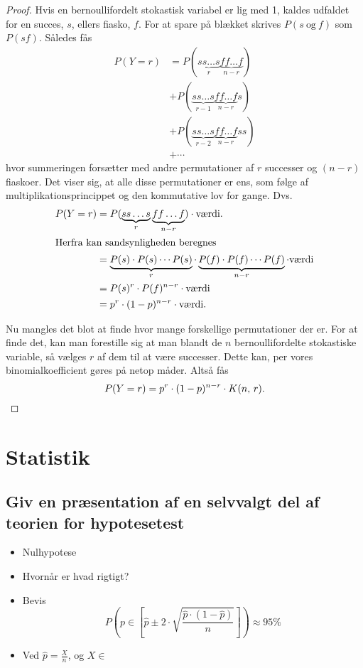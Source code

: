 \documentclass{article}
\begin{document}
\begin{proof}
Hvis en bernoullifordelt stokastisk variabel er lig med 1, kaldes udfaldet for
en succes, $s$, ellers fiasko, $f$. For at spare på blækket skrives
$P(s\:\text{og}\:f)$ som $P(sf)$. Således fås
\begin{align*}
	P(Y = r) &= P(\underbrace{ss \dotso s}_r \underbrace{ff \dotso f}_{n-r})\\ 
			 &+ P(\underbrace{ss \dotso s}_{r-1} \underbrace{ff \dotso f}_{n-r}s)\\
			 &+ P(\underbrace{ss \dotso s}_{r-2} \underbrace{ff \dotso f}_{n-r}ss)\\
			 &+ \dotsb
\end{align*}
hvor summeringen forsætter med andre permutationer af $r$ successer og $(n-r)$
fiaskoer. Det viser sig, at alle disse permutationer er ens, som følge af
multiplikationsprincippet og den kommutative lov for gange. Dvs.
\begin{align*}
	P(Y = r) &= P(\underbrace{ss \dotso s}_r \underbrace{ff \dotso f}_{n-r}) \cdot \text{værdi}.\\
	\intertext{Herfra kan sandsynligheden beregnes}
			 &= \underbrace{P(s) \cdot P(s) \dotsm P(s)}_r \cdot 
			 \underbrace{P(f) \cdot P(f) \dotsm P(f)}_{n-r} \cdot \text{værdi}\\
			 &= P(s)^r \cdot P(f)^{n-r} \cdot \text{værdi}\\
			 &= p^r \cdot (1-p)^{n-r} \cdot \text{værdi}.
\end{align*}


Nu mangles det blot at finde hvor mange forskellige permutationer der er. For at
finde det, kan man forestille sig at man blandt de $n$ bernoullifordelte
stokastiske variable, så vælges $r$ af dem til at være successer. Dette kan, per
vores binomialkoefficient gøres på netop  måder. Altså fås
\[
	P(Y = r) = p^r \cdot (1-p)^{n-r} \cdot \nobreak{K(n,\,r)}.\qedhere
\] 
\end{proof}

\section{Statistik}
\subsection{Giv en præsentation af en selvvalgt del af teorien for hypotesetest}
\begin{itemize}
	\item Nulhypotese
	\item Hvornår er hvad rigtigt?
	\item Bevis
		\[
			P(p\in[\hat p \pm 2\cdot\sqrt{\frac{\hat p\cdot(1-\hat p)}{n}}]) \approx 95\%
		\]
	\item Ved $\hat p = \frac{X}{n}$, og $X \in $
\end{itemize}
\end{document}
